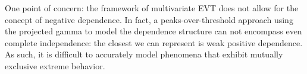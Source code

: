     One point of concern: the framework of multivariate EVT does not allow for the concept of negative dependence.  
    In fact, a peaks-over-threshold approach using the projected gamma to model the dependence structure can not
    encompass even complete independence: the closest we can represent is weak positive dependence.
    As such, it is difficult to accurately model phenomena that exhibit mutually exclusive extreme behavior.

    

